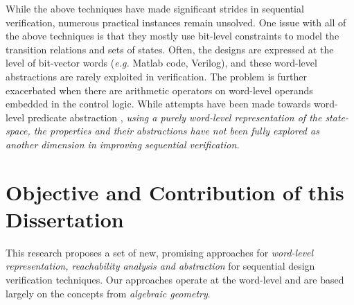 While the above techniques have made significant strides in sequential
verification, numerous practical instances remain unsolved. One issue
with all of the above techniques is that they mostly use bit-level
constraints to model the transition relations and sets of 
states. Often,
the designs are expressed at the level of bit-vector words
({\it e.g.} Matlab code, Verilog), and these word-level abstractions are
rarely exploited in verification. The problem is further exacerbated
when there are arithmetic operators on word-level operands embedded in
the control logic. While attempts have been made towards word-level
predicate abstraction \cite{jain2005word,mcmillan:cav06,mcmillan2010lazy}, 
{\it using a purely word-level representation
  of the state-space, the properties and their abstractions have not
  been fully explored as another dimension in improving sequential
  verification.}  


   



\section{Objective and Contribution of this Dissertation}
This research proposes a
set of new, promising approaches for {\it word-level representation,
reachability analysis and abstraction} for sequential design verification techniques. 
Our approaches operate at the word-level and are based
largely on the concepts from {\it algebraic geometry}. 

